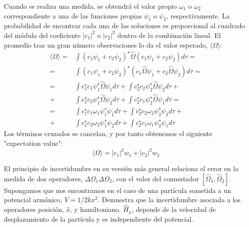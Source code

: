 \documentclass[addpoints,spanish, 12pt,a4paper]{exam}
\begin{document}
\begin{questions}
    \begin{solution}
        \selectfont
    Cuando se realiza una medida, se obtendrá el valor 
    propio $\omega_1$ o $\omega_2$ correspondiente a una
    de las funciones propias $\psi_1$ o $\psi_2$, 
    respectivamente. La probabilidad de encontrar 
    cada una de las soluciones es proporcional
    al cuadrado del módulo del coeficiente $|c_1|^2$ 
    o $|c_2|^2$ dentro de la combinación lineal. 
    El promedio tras un gran número observaciones lo 
    da el valor esperado, $\langle\Omega\rangle$:
    \begin{align*}
    \langle\Omega\rangle  =& 
\int (c_1\psi_1 + c_2\psi_2)^\star
\hat{\Omega}(c_1\psi_1 + c_2\psi_2)d\tau = \\
=&\int (c_1\psi_1 + c_2\psi_2)^\star
(c_1\hat{\Omega}\psi_1 + c_2\hat{\Omega}\psi_2)d\tau = \\
=&\int c_1^\star c_1\psi_1^\star\hat{\Omega}\psi_1 d\tau + 
\int c_2^\star c_2\psi_2^\star\hat{\Omega}\psi_2 d\tau +\\ +&\int c_1^\star c_2\psi_1^\star\hat{\Omega}\psi_2 d\tau + 
\int c_2^\star c_1\psi_2^\star\hat{\Omega}\psi_1 d\tau = \\
=& \int c_1^\star c_1\omega_1\psi_1^\star\psi_1 d\tau + 
\int c_2^\star c_2\omega_2\psi_2^\star\psi_2 d\tau + \\
+&\int c_1^\star c_2\omega_2\psi_1^\star\psi_2 d\tau + 
\int c_2^\star c_1\omega_1\psi_2^\star\psi_1 d\tau 
    \end{align*}
    Los términos cruzados se cancelan, y por tanto 
    obtenemos el siguiente "expectation value":
    \begin{equation*}
    \langle\Omega\rangle = |c_1|^2w_1 + |c_2|^2w_2
    \end{equation*}
    \vspace*{5\baselineskip}
    \end{solution}
    
    \question[1\half] El principio de incertidumbre
    en su versión más general relaciona el error en 
    la medida de dos operadores,
    $\Delta\Omega_1\Delta\Omega_2$,
    con el valor del conmutador
    $[\hat{\Omega}_1,\hat{\Omega}_2]$. Supongamos
    que nos encontramos en el caso de una partícula
    sometida a un potencial armónico, $V=1/2kx^2$.
    Demuestra que la incertidumbre asociada a los
    operadores posición, $\hat{x}$, y hamiltoniano,
    $\hat{H}_x$, depende de la velocidad de
    desplazamiento de la partícula y es independiente
    del potencial.


\end{questions}
\end{document}
